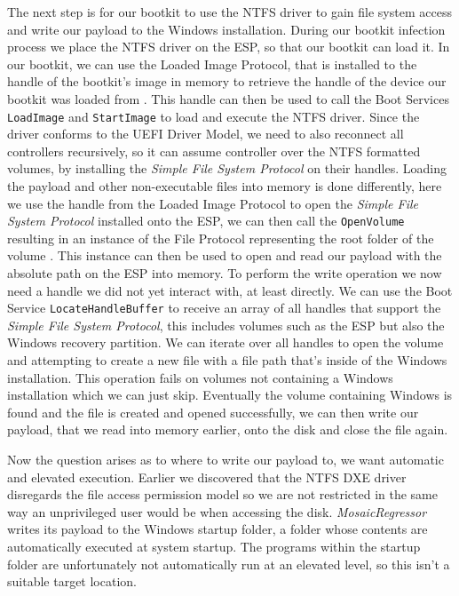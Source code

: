 The next step is for our bootkit to use the NTFS driver to gain file system access and write our payload to the Windows installation. During our bootkit infection process we place the NTFS driver on the \ac{ESP}, so that our bootkit can load it. In our bootkit, we can use the Loaded Image Protocol, that is installed to the handle of the bootkit's image in memory to retrieve the handle of the device our bootkit was loaded from \cite[9.1 EFI Loaded Image Protocol]{uefi-spec}. This handle can then be used to call the Boot Services \lstinline{LoadImage} and \lstinline{StartImage} to load and execute the NTFS driver. Since the driver conforms to the UEFI Driver Model, we need to also reconnect all controllers recursively, so it can assume controller over the NTFS formatted volumes, by installing the \emph{Simple File System Protocol} on their handles. Loading the payload and other non-executable files into memory is done differently, here we use the handle from the Loaded Image Protocol to open the \emph{Simple File System Protocol} installed onto the \ac{ESP}, we can then call the \lstinline{OpenVolume} resulting in an instance of the File Protocol representing the root folder of the volume \cite[13.4]{uefi-spec}. This instance can then be used to open and read our payload with the absolute path on the \ac{ESP} into memory.
To perform the write operation we now need a handle we did not yet interact with, at least directly. We can use the Boot Service \lstinline{LocateHandleBuffer} to receive an array of all handles that support the \emph{Simple File System Protocol}, this includes volumes such as the \ac{ESP} but also the Windows recovery partition. We can iterate over all handles to open the volume and attempting to create a new file with a file path that's inside of the Windows installation. This operation fails on volumes not containing a Windows installation which we can just skip. Eventually the volume containing Windows is found and the file is created and opened successfully, we can then write our payload, that we read into memory earlier, onto the disk and close the file again.

Now the question arises as to where to write our payload to, we want automatic and elevated execution. Earlier we discovered that the \ac{NTFS} \ac{DXE} driver disregards the file access permission model  so we are not restricted in the same way an unprivileged user would be when accessing the disk. \emph{MosaicRegressor} writes its payload to the Windows startup folder, a folder whose contents are automatically executed at system startup. The programs within the startup folder are unfortunately not automatically run at an elevated level, so this isn't a suitable target location.



